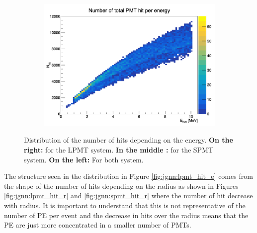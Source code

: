 \documentclass[../main.tex]{subfiles}
\begin{document}
\begin{figure}[ht]
\begin{subfigure}[t]{0.32\linewidth}
    \includegraphics[width=\linewidth]{images/jgnn/tot_hit_e.png}
    \caption{}
    \label{fig:jgnn:tot_hit_e}
  \end{subfigure}
  \caption{Distribution of the number of hits depending on the energy. \textbf{On the right:} for the LPMT system. \textbf{In the middle :} for the SPMT system. \textbf{On the left: } For both system.}
\end{figure}

The structure seen in the distribution in Figure \ref{fig:jgnn:lpmt_hit_e} comes from the shape of the number of hits depending on the radius as shown in Figures \ref{fig:jgnn:lpmt_hit_r} and \ref{fig:jgnn:spmt_hit_r} where the number of hit decrease with radius. It is important to understand that this is not representative of the number of PE per event and the decrease in hits over the radius means that the PE are just more concentrated in a smaller number of PMTs.
\end{document}
